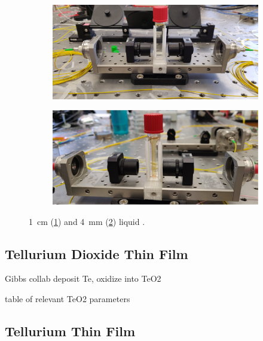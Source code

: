 \begin{figure}[t]
    \centering
    \begin{subfigure}[b]{0.49\textwidth}
        \centering
        \includegraphics[width=\textwidth]{figs/4-Raman/1cmCS2.jpeg}
        \caption{}
        \label{fig:Raman:1cmCS2}
    \end{subfigure}
    \hfill
    \begin{subfigure}[b]{0.49\textwidth}
        \centering
        \includegraphics[width=\textwidth]{figs/4-Raman/4mmCS2.jpg}
        \caption{}
        \label{fig:Raman:4mmCS2}
    \end{subfigure}
    \caption{\SI{1}{\centi\meter} (\ref{fig:Raman:1cmCS2}) and \SI{4}{\milli\meter} (\ref{fig:Raman:4mmCS2}) liquid .}
    \label{fig:Raman:CS2Cuvet}
\end{figure}

\subsection{Tellurium Dioxide Thin Film}
\label{subsec:Raman:Target:TeO2}

Gibbs collab
deposit Te, oxidize into TeO2

table of relevant TeO2 parameters

\subsection{Tellurium Thin Film}
\label{subsec:Raman:Target:Te}

